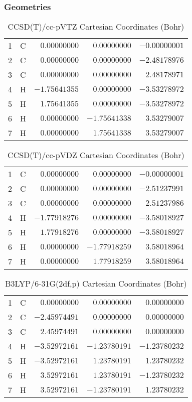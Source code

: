 \documentclass[10pt,oneside]{article}
\begin{document}
\subsubsection*{Geometries}
\begin{table}[h!]
\centering
\caption{CCSD(T)/cc-pVTZ Cartesian Coordinates (Bohr)}
\begin{tabular}{llrrr}
1  & C  & $ 0.00000000$ & $ 0.00000000$ & $-0.00000001$ \\
2  & C  & $ 0.00000000$ & $ 0.00000000$ & $-2.48178976$ \\
3  & C  & $ 0.00000000$ & $ 0.00000000$ & $ 2.48178971$ \\
4  & H  & $-1.75641355$ & $ 0.00000000$ & $-3.53278972$ \\
5  & H  & $ 1.75641355$ & $ 0.00000000$ & $-3.53278972$ \\
6  & H  & $ 0.00000000$ & $-1.75641338$ & $ 3.53279007$ \\
7  & H  & $ 0.00000000$ & $ 1.75641338$ & $ 3.53279007$ \\
\end{tabular}
\end{table}

\begin{table}[h!]
\centering
\caption{CCSD(T)/cc-pVDZ Cartesian Coordinates (Bohr)}
\begin{tabular}{llrrr}
1  & C  & $ 0.00000000$ & $ 0.00000000$ & $-0.00000001$ \\
2  & C  & $ 0.00000000$ & $ 0.00000000$ & $-2.51237991$ \\
3  & C  & $ 0.00000000$ & $ 0.00000000$ & $ 2.51237986$ \\
4  & H  & $-1.77918276$ & $ 0.00000000$ & $-3.58018927$ \\
5  & H  & $ 1.77918276$ & $ 0.00000000$ & $-3.58018927$ \\
6  & H  & $ 0.00000000$ & $-1.77918259$ & $ 3.58018964$ \\
7  & H  & $ 0.00000000$ & $ 1.77918259$ & $ 3.58018964$ \\
\end{tabular}
\end{table}

\begin{table}[h!]
\centering
\caption{B3LYP/6-31G(2df,p) Cartesian Coordinates (Bohr)}
\begin{tabular}{llrrr}
1  & C  & $ 0.00000000$ & $ 0.00000000$ & $ 0.00000000$ \\
2  & C  & $-2.45974491$ & $ 0.00000000$ & $ 0.00000000$ \\
3  & C  & $ 2.45974491$ & $ 0.00000000$ & $ 0.00000000$ \\
4  & H  & $-3.52972161$ & $-1.23780191$ & $-1.23780232$ \\
5  & H  & $-3.52972161$ & $ 1.23780191$ & $ 1.23780232$ \\
6  & H  & $ 3.52972161$ & $ 1.23780191$ & $-1.23780232$ \\
7  & H  & $ 3.52972161$ & $-1.23780191$ & $ 1.23780232$ \\
\end{tabular}
\end{table}
\end{document}

